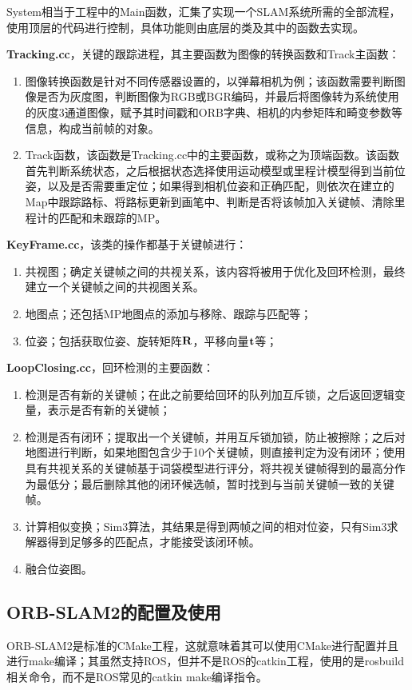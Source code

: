 System相当于工程中的Main函数，汇集了实现一个SLAM系统所需的全部流程，使用顶层的代码进行控制，具体功能则由底层的类及其中的函数去实现。

\textbf{Tracking.cc}，关键的跟踪进程，其主要函数为图像的转换函数和Track主函数：
\begin{enumerate}
	\item 
	图像转换函数是针对不同传感器设置的，以弹幕相机为例；该函数需要判断图像是否为灰度图，判断图像为RGB或BGR编码，并最后将图像转为系统使用的灰度3通道图像，赋予其时间戳和ORB字典、相机的内参矩阵和畸变参数等信息，构成当前帧的对象。
	\item 
	Track函数，该函数是Tracking.cc中的主要函数，或称之为顶端函数。该函数首先判断系统状态，之后根据状态选择使用运动模型或里程计模型得到当前位姿，以及是否需要重定位；如果得到相机位姿和正确匹配，则依次在建立的Map中跟踪路标、将路标更新到画笔中、判断是否将该帧加入关键帧、清除里程计的匹配和未跟踪的MP。
\end{enumerate}

\textbf{KeyFrame.cc}，该类的操作都基于关键帧进行：

\begin{enumerate}
	\item 
	共视图；确定关键帧之间的共视关系，该内容将被用于优化及回环检测，最终建立一个关键帧之间的共视图关系。
	\item 
	地图点；还包括MP地图点的添加与移除、跟踪与匹配等；
	\item 
	位姿；包括获取位姿、旋转矩阵$\bf{R}$，平移向量$\bf{t}$等；
\end{enumerate}

\textbf{LoopClosing.cc}，回环检测的主要函数：

\begin{enumerate}
	\item 检测是否有新的关键帧；在此之前要给回环的队列加互斥锁，之后返回逻辑变量，表示是否有新的关键帧；
	\item 检测是否有闭环；提取出一个关键帧，并用互斥锁加锁，防止被擦除；之后对地图进行判断，如果地图包含少于10个关键帧，则直接判定为没有闭环；使用具有共视关系的关键帧基于词袋模型进行评分，将共视关键帧得到的最高分作为最低分；最后删除其他的闭环候选帧，暂时找到与当前关键帧一致的关键帧。
	\item 计算相似变换；Sim3算法，其结果是得到两帧之间的相对位姿，只有Sim3求解器得到足够多的匹配点，才能接受该闭环帧。
	\item 融合位姿图。
\end{enumerate}

\subsection{ORB-SLAM2的配置及使用}
ORB-SLAM2是标准的CMake工程，这就意味着其可以使用CMake进行配置并且进行make编译；其虽然支持ROS，但并不是ROS的catkin工程，使用的是rosbuild相关命令，而不是ROS常见的catkin make编译指令。

